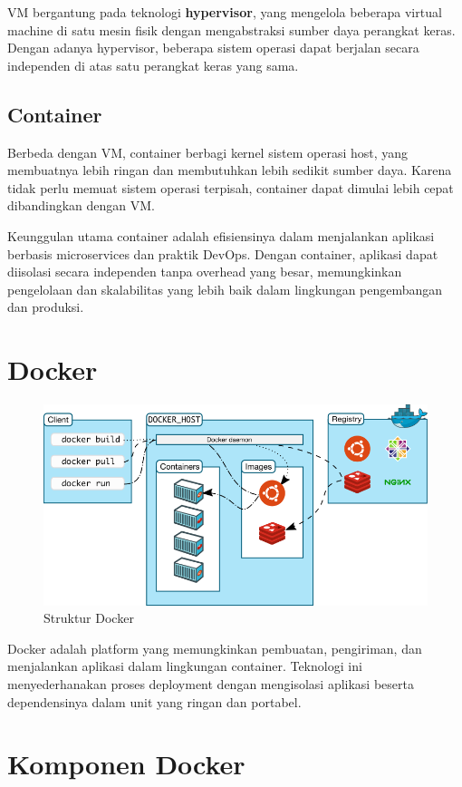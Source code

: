 VM bergantung pada teknologi \textbf{hypervisor}, yang mengelola beberapa virtual machine di satu mesin fisik dengan mengabstraksi sumber daya perangkat keras. Dengan adanya hypervisor, beberapa sistem operasi dapat berjalan secara independen di atas satu perangkat keras yang sama.

\subsection{Container}
Berbeda dengan VM, container berbagi kernel sistem operasi host, yang membuatnya lebih ringan dan membutuhkan lebih sedikit sumber daya. Karena tidak perlu memuat sistem operasi terpisah, container dapat dimulai lebih cepat dibandingkan dengan VM.

Keunggulan utama container adalah efisiensinya dalam menjalankan aplikasi berbasis microservices dan praktik DevOps. Dengan container, aplikasi dapat diisolasi secara independen tanpa overhead yang besar, memungkinkan pengelolaan dan skalabilitas yang lebih baik dalam lingkungan pengembangan dan produksi.


\section{Docker}

\begin{figure}[h]
	\centering
	\includegraphics[width=\textwidth]{../images/docker.png}
	\caption{Struktur Docker}
	\label{fig:docker}
\end{figure}

Docker adalah platform yang memungkinkan pembuatan, pengiriman, dan menjalankan aplikasi dalam lingkungan container. Teknologi ini menyederhanakan proses deployment dengan mengisolasi aplikasi beserta dependensinya dalam unit yang ringan dan portabel.

\section{Komponen Docker}

